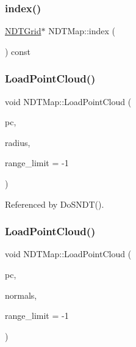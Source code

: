 \mbox{\label{classNDTMap_ad319bbb8860c6f2214a30bb7d64525e5}} 
\subsubsection{\texorpdfstring{index()}{index()}}
{\footnotesize\ttfamily \hyperlink{classNDTGrid}{N\+D\+T\+Grid}$\ast$ N\+D\+T\+Map\+::index (\begin{DoxyParamCaption}{ }\end{DoxyParamCaption}) const\hspace{0.3cm}{\ttfamily [inline]}}

\mbox{\label{classNDTMap_a7a6596502043035b352cb470f869f79c}} 
\subsubsection{\texorpdfstring{Load\+Point\+Cloud()}{LoadPointCloud()}\hspace{0.1cm}{\footnotesize\ttfamily [1/3]}}
{\footnotesize\ttfamily void N\+D\+T\+Map\+::\+Load\+Point\+Cloud (\begin{DoxyParamCaption}\item[{\hyperlink{ndt__map_8h_a467e4d48ef8154e4fd6d76d355cae2da}{P\+C\+X\+Y\+Z\+Ptr}}]{pc,  }\item[{double}]{radius,  }\item[{double}]{range\+\_\+limit = {\ttfamily -\/1} }\end{DoxyParamCaption})}



Referenced by Do\+S\+N\+D\+T().

\mbox{\label{classNDTMap_a1a724122f19f58baa09c0e24b67ca697}} 
\subsubsection{\texorpdfstring{Load\+Point\+Cloud()}{LoadPointCloud()}\hspace{0.1cm}{\footnotesize\ttfamily [2/3]}}
{\footnotesize\ttfamily void N\+D\+T\+Map\+::\+Load\+Point\+Cloud (\begin{DoxyParamCaption}\item[{const \hyperlink{ndt__map_8h_a20282c1dd3c86f9bc25e124768cdbe3d}{P\+C\+X\+YZ} \&}]{pc,  }\item[{const \hyperlink{ndt__map_8h_a20282c1dd3c86f9bc25e124768cdbe3d}{P\+C\+X\+YZ} \&}]{normals,  }\item[{double}]{range\+\_\+limit = {\ttfamily -\/1} }\end{DoxyParamCaption})}

